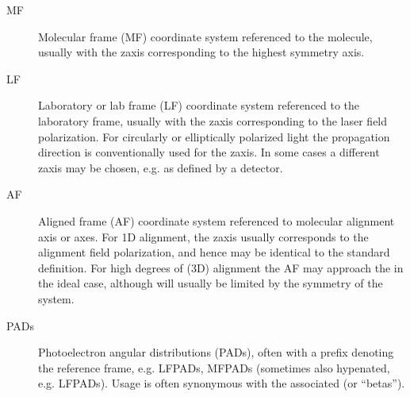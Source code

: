 \documentclass[letterpaper,table,10pt,english]{jupyterBook}
\begin{document}
\label{\detokenize{backmatter/glossary:glossary}}\label{\detokenize{backmatter/glossary::doc}}\begin{description}
\item[{MF\label{\detokenize{backmatter/glossary:term-MF}}}] \leavevmode
\sphinxAtStartPar
Molecular frame (MF) \sphinxhyphen{} coordinate system referenced to the molecule, usually with the z\sphinxhyphen{}axis corresponding to the highest symmetry axis.

\item[{LF\label{\detokenize{backmatter/glossary:term-LF}}}] \leavevmode
\sphinxAtStartPar
Laboratory or lab frame (LF) \sphinxhyphen{} coordinate system referenced to the laboratory frame, usually with the z\sphinxhyphen{}axis corresponding to the laser field polarization. For circularly or elliptically polarized light the propagation direction is conventionally used for the z\sphinxhyphen{}axis. In some cases a different z\sphinxhyphen{}axis may be chosen, e.g. as defined by a detector.

\item[{AF\label{\detokenize{backmatter/glossary:term-AF}}}] \leavevmode
\sphinxAtStartPar
Aligned frame (AF) \sphinxhyphen{} coordinate system referenced to molecular alignment axis or axes. For 1D alignment, the z\sphinxhyphen{}axis usually corresponds to the alignment field polarization, and hence may be identical to the standard {\hyperref[\detokenize{backmatter/glossary:term-LF}]{}} definition. For high degrees of (3D) alignment the AF may approach the {\hyperref[\detokenize{backmatter/glossary:term-MF}]{}} in the ideal case, although will usually be limited by the symmetry of the system.

\item[{PADs\label{\detokenize{backmatter/glossary:term-PADs}}}] \leavevmode
\sphinxAtStartPar
Photoelectron angular distributions (PADs), often with a prefix denoting the reference frame, e.g. LFPADs, MFPADs (sometimes also hypenated, e.g. LF\sphinxhyphen{}PADs). Usage is often synonymous with the associated {\hyperref[\detokenize{backmatter/glossary:term-anisotropy-paramters}]{}} (or “betas”).


\end{description}
\end{document}

